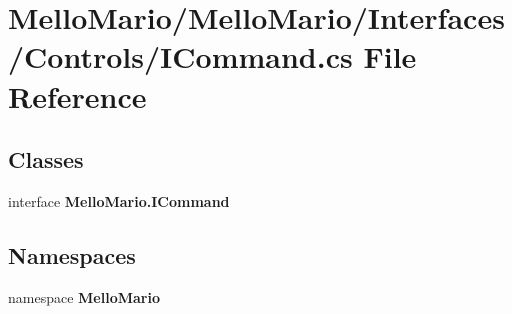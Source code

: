 \section{Mello\+Mario/\+Mello\+Mario/\+Interfaces/\+Controls/\+I\+Command.cs File Reference}
\label{ICommand_8cs}
\subsection*{Classes}
\begin{DoxyCompactItemize}
\item 
interface \textbf{ Mello\+Mario.\+I\+Command}
\end{DoxyCompactItemize}
\subsection*{Namespaces}
\begin{DoxyCompactItemize}
\item 
namespace \textbf{ Mello\+Mario}
\end{DoxyCompactItemize}
